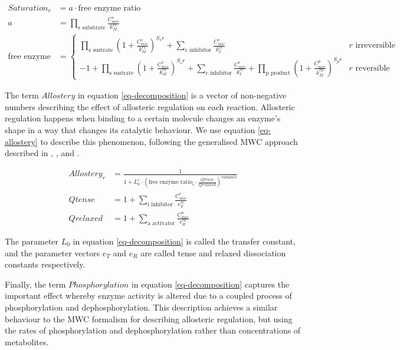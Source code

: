 \documentclass[journal=asbcd6,manuscript=article,layout=traditional]{achemso}
\begin{document}
\begin{align} 
Saturation_r &= a \cdot \text{free enzyme ratio}\label{eq-saturation} \\ 
a &= \prod_{\text{s substrate}}\frac{C_{mic}^s}{k_{M}^{rs}} \nonumber \\ 
\text{free enzyme ratio} &= \begin{cases} 
  \prod_{\text{s sustrate}} (1 + \frac{C_{mic}^s}{k_{M}^{rs}})^{S_sr} 
  + \sum_{\text{c inhibitor}}\frac{C_{mic}^c}{k_I^{rc}} & r\text{ irreversible} \\ 
  -1 
  + \prod_{\text{s sustrate}} (1 + \frac{C_{mic}^s}{k_{M}^{rs}})^{S_sr} 
     + \sum_{\text{c inhibitor}}\frac{C_{mic}^c}{k_I^{rc}} 
     + \prod_{\text{p product}} (1 + \frac{C_{mic}^p}{k_{M}^{rp}})^{S_pr}  & r\text{ reversible} 
    \end{cases} \nonumber
\end{align}

The term \(Allostery\) in equation \eqref{eq-decomposition} is a vector
of non-negative numbers describing the effect of allosteric regulation
on each reaction. Allosteric regulation happens when binding to a
certain molecule changes an enzyme's shape in a way that changes its
catalytic behaviour. We use equation \eqref{eq-allostery} to describe
this phenomenon, following the generalised MWC approach described in
\citet{monod_nature_1965}, \citet{changeux_2013},
\citet{popova_generalization_1975} and \citet{popova_description_1979}.

\begin{align} 
  Allostery_r &= \frac{1}{1 + L_0^r \cdot (\text{free enzyme ratio}_r \cdot \frac{Qtense}{Qrelaxed})^{subunits}}\label{eq-allostery} \\ 
       Qtense &= 1 + \sum_{\text{i inhibitor}} \frac{C_{mic}^i}{e_T^{ri}}\nonumber \\ 
     Qrelaxed &= 1 + \sum_{\text{a activator}} \frac{C_{mic}^a}{e_R^{ra}}\nonumber
\end{align}

The parameter \(L_0\) in equation \eqref{eq-decomposition} is called the
transfer constant, and the parameter vectors \(e_T\) and \(e_R\) are
called tense and relaxed dissociation constants respectively.

Finally, the term \(Phosphorylation\) in equation
\eqref{eq-decomposition} captures the important effect whereby enzyme
activity is altered due to a coupled process of phosphorylation and
dephosphorylation. This description achieves a similar behaviour to the
MWC formalism for describing allosteric regulation, but using the rates
of phosphorylation and dephosphorylation rather than concentrations of
metabolites.
\end{document}
